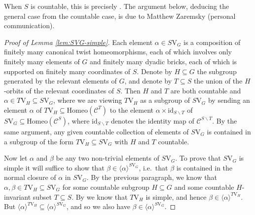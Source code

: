 \documentclass[10pt,a4paper]{amsart}
\numberwithin{equation}{section}
\numberwithin{figure}{section}
\theoremstyle{definition}
\newcommand{\cC}{\mathcal{C}}
\newcommand{\V}{\mathrm{V}}
\begin{document}
When $S$ is countable, this is precisely \cite[Theorem 3.4]{BelkZaremsky22}. The argument below, deducing the general case from the countable case, is due to Matthew Zaremsky (personal communication).

\begin{proof}[Proof of Lemma \ref{lem:SVG-simple}]
Each element $\alpha \in S\V_G$ is a composition of finitely many canonical twist homeomorphisms, each of which involves only finitely many elements of $G$ and finitely many dyadic bricks, each of which is supported on finitely many coordinates of $S$. Denote by $H \subseteq G$ the subgroup generated by the relevant elements of $G$, and denote by $T \subseteq S$ the union of the $H$-orbits of the relevant coordinates of $S$. Then $H$ and $T$ are both countable and $\alpha \in T\V_H \subseteq S\V_G$, where we are viewing $T\V_H$ as a subgroup of $S\V_G$ by sending an element $\alpha$ of $T\V_H \subseteq \mathrm{Homeo}(\cC^T)$ to the element $\alpha \times \mathrm{id}_{S \smallsetminus T}$ of $S\V_G \subseteq \mathrm{Homeo}(\cC^S)$, where $\mathrm{id}_{S \smallsetminus T}$ denotes the identity map of $\cC^{S \smallsetminus T}$. By the same argument, any given countable collection of elements of $S\V_G$ is contained in a subgroup of the form $T\V_H \subseteq S\V_G$ with $H$ and $T$ countable.

Now let $\alpha$ and $\beta$ be any two non-trivial elements of $S\V_G$. To prove that $S\V_G$ is simple it will suffice to show that $\beta \in \langle \alpha \rangle^{S\V_G}$, i.e.\ that $\beta$ is contained in the normal closure of $\alpha$ in $S\V_G$. By the previous paragraph, we know that $\alpha,\beta \in T\V_H \subseteq S\V_G$ for some countable subgroup $H \subseteq G$ and some countable $H$-invariant subset $T \subseteq S$. By \cite[Theorem 3.4]{BelkZaremsky22} we know that $T\V_H$ is simple, and hence $\beta \in \langle \alpha \rangle^{T\V_H}$. But $\langle \alpha \rangle^{T\V_H} \subseteq \langle \alpha \rangle^{S\V_G}$, and so we also have $\beta \in \langle \alpha \rangle^{S\V_G}$.
\end{proof}



\end{document}
